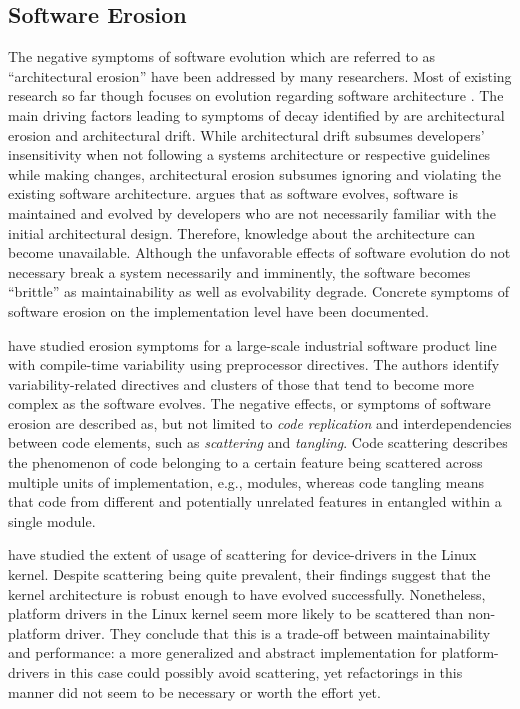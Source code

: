 \subsection{Software Erosion}
The negative symptoms of software evolution which are referred to as
``architectural erosion'' \citep{breivold_systematic_2012} have
been addressed by many researchers.
Most of existing research so far though focuses on evolution regarding software architecture
\citep{breivold_systematic_2012}. The main driving factors leading to symptoms of decay
identified by \cite{perry_software_1991} are architectural erosion and
architectural drift. While architectural drift subsumes developers'
insensitivity when not following a systems architecture or respective guidelines while making changes, architectural erosion subsumes ignoring and violating the existing software
architecture. \cite{parnas_software_1994} argues that as software evolves, software is maintained
and evolved by developers who are not necessarily familiar with the initial
architectural design. Therefore, knowledge about the architecture can become
unavailable. Although the unfavorable effects of software evolution do not necessary break a
system necessarily and imminently, the software becomes ``brittle'' \citep{perry_software_1991}
as maintainability as well as evolvability degrade. Concrete  symptoms of software
erosion on the implementation level have been documented. 

\cite{zhang_variability_2013} have studied erosion symptoms for a large-scale
industrial software product line with compile-time variability using
preprocessor directives.
The authors identify variability-related directives and clusters of those that
tend to become more complex as the software evolves. The negative effects, or symptoms of software
erosion are described as, but not limited to \emph{code replication} and
interdependencies between code elements, such as \emph{scattering} and
\emph{tangling}. Code scattering describes the phenomenon of code belonging to
a certain feature being scattered across multiple units of implementation,
e.g., modules, whereas code tangling means that code from different and
potentially unrelated features in entangled within a single module.

\cite{passos_feature_2015} have studied the extent of usage of scattering for device-drivers
in the Linux kernel. Despite scattering being quite prevalent, their
findings suggest that the kernel architecture is robust enough to have evolved
successfully. Nonetheless, platform drivers in the Linux kernel seem more
likely to be scattered than non-platform driver. They conclude that this is a
trade-off between maintainability and performance: a more generalized and
abstract implementation for platform-drivers in this case could possibly avoid
scattering, yet refactorings in this manner did not seem to be necessary or
worth the effort yet.

